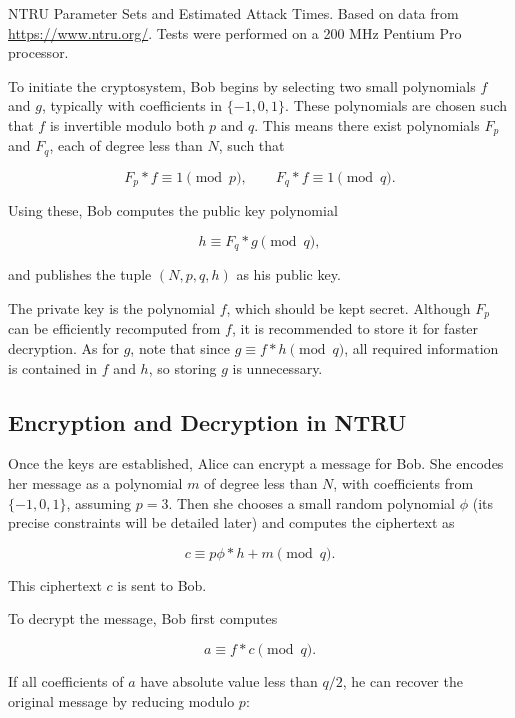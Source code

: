 \documentclass[a4paper,12pt]{article}
\begin{document}
NTRU Parameter Sets and Estimated Attack Times. Based on data from \url{https://www.ntru.org/}. Tests were performed on a 200 MHz Pentium Pro processor.

\newpage

To initiate the cryptosystem, Bob begins by selecting two small polynomials \( f \) and \( g \), typically with coefficients in \(\{-1, 0, 1\}\). These polynomials are chosen such that \( f \) is invertible modulo both \( p \) and \( q \). This means there exist polynomials \( F_p \) and \( F_q \), each of degree less than \( N \), such that

\[
F_p * f \equiv 1 \pmod{p}, \qquad F_q * f \equiv 1 \pmod{q}.
\]

Using these, Bob computes the public key polynomial

\[
h \equiv F_q * g \pmod{q},
\]

and publishes the tuple \( (N, p, q, h) \) as his public key.

\medskip

The private key is the polynomial \( f \), which should be kept secret. Although \( F_p \) can be efficiently recomputed from \( f \), it is recommended to store it for faster decryption. As for \( g \), note that since \( g \equiv f * h \pmod{q} \), all required information is contained in \( f \) and \( h \), so storing \( g \) is unnecessary.


\subsection*{Encryption and Decryption in NTRU}

Once the keys are established, Alice can encrypt a message for Bob. She encodes her message as a polynomial \( m \) of degree less than \( N \), with coefficients from \( \{ -1, 0, 1 \} \), assuming \( p = 3 \). Then she chooses a small random polynomial \( \phi \) (its precise constraints will be detailed later) and computes the ciphertext as

\[
c \equiv p\phi * h + m \pmod{q}.
\]

This ciphertext \( c \) is sent to Bob.

\medskip

To decrypt the message, Bob first computes

\[
a \equiv f * c \pmod{q}.
\]

If all coefficients of \( a \) have absolute value less than \( q/2 \), he can recover the original message by reducing modulo \( p \):
\end{document}
